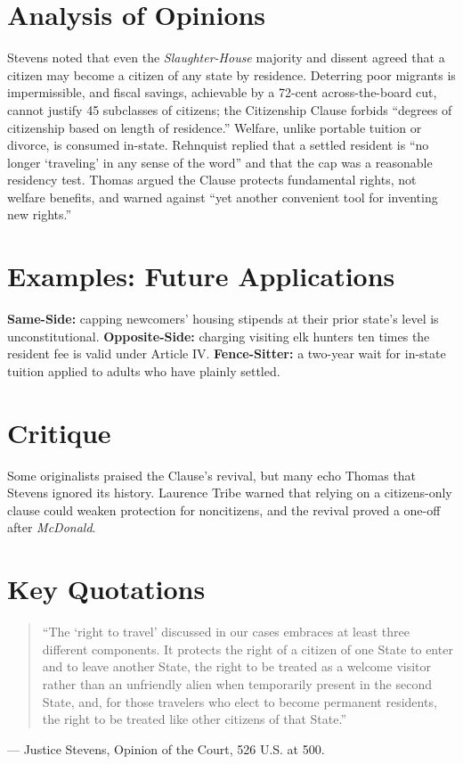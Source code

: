 \documentclass[12pt]{article}
\begin{document}
\section{Analysis of Opinions}
Stevens noted that even the \textit{Slaughter-House} majority and dissent agreed that a citizen may become a citizen of any state by residence. Deterring poor migrants is impermissible, and fiscal savings, achievable by a 72-cent across-the-board cut, cannot justify 45 subclasses of citizens; the Citizenship Clause forbids ``degrees of citizenship based on length of residence.'' Welfare, unlike portable tuition or divorce, is consumed in-state. Rehnquist replied that a settled resident is ``no longer `traveling' in any sense of the word'' and that the cap was a reasonable residency test. Thomas argued the Clause protects fundamental rights, not welfare benefits, and warned against ``yet another convenient tool for inventing new rights.''

\section{Examples: Future Applications}
\textbf{Same-Side:} capping newcomers' housing stipends at their prior state's level is unconstitutional. \textbf{Opposite-Side:} charging visiting elk hunters ten times the resident fee is valid under Article IV. \textbf{Fence-Sitter:} a two-year wait for in-state tuition applied to adults who have plainly settled.

\section{Critique}
Some originalists praised the Clause's revival, but many echo Thomas that Stevens ignored its history. Laurence Tribe warned that relying on a citizens-only clause could weaken protection for noncitizens, and the revival proved a one-off after \textit{McDonald}.

\section{Key Quotations}
\begin{quote}
``The `right to travel' discussed in our cases embraces at least three different components. It protects the right of a citizen of one State to enter and to leave another State, the right to be treated as a welcome visitor rather than an unfriendly alien when temporarily present in the second State, and, for those travelers who elect to become permanent residents, the right to be treated like other citizens of that State.''
\end{quote}
\noindent --- Justice Stevens, Opinion of the Court, 526 U.S. at 500.
\end{document}
